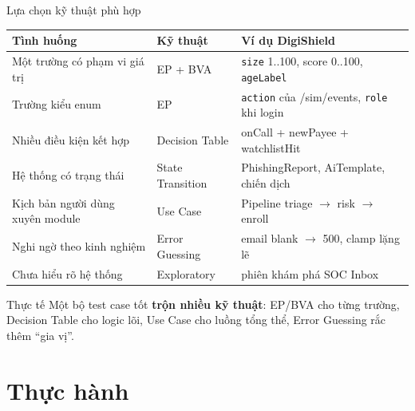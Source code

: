 \documentclass[aspectratio=169,12pt]{beamer}
\begin{document}
\begin{frame}[shrink=10]{Lựa chọn kỹ thuật phù hợp}
  \begin{center}
  \scriptsize
  \setlength{\tabcolsep}{4pt}
  \renewcommand{\arraystretch}{0.95}
  \begin{tabular}{p{3.4cm}p{2.4cm}p{5.6cm}}
    \toprule
    \textbf{Tình huống} & \textbf{Kỹ thuật} & \textbf{Ví dụ DigiShield} \\
    \midrule
    Một trường có phạm vi giá trị & EP + BVA & \texttt{size} 1..100, score 0..100, \texttt{ageLabel} \\
    Trường kiểu enum & EP & \texttt{action} của /sim/events, \texttt{role} khi login \\
    Nhiều điều kiện kết hợp & Decision Table & onCall + newPayee + watchlistHit \\
    Hệ thống có trạng thái & State Transition & PhishingReport, AiTemplate, chiến dịch \\
    Kịch bản người dùng xuyên module & Use Case & Pipeline triage $\to$ risk $\to$ enroll \\
    Nghi ngờ theo kinh nghiệm & Error Guessing & email blank $\to$ 500, clamp lặng lẽ \\
    Chưa hiểu rõ hệ thống & Exploratory & phiên khám phá SOC Inbox \\
    \bottomrule
  \end{tabular}
  \renewcommand{\arraystretch}{1}
  \end{center}

  \vspace{0.1em}
  \begin{exampleblock}{Thực tế}
    \small Một bộ test case tốt \textbf{trộn nhiều kỹ thuật}: EP/BVA cho từng
    trường, Decision Table cho logic lõi, Use Case cho luồng tổng thể,
    Error Guessing rắc thêm ``gia vị''.
  \end{exampleblock}
\end{frame}

\section{Thực hành}
\end{document}
